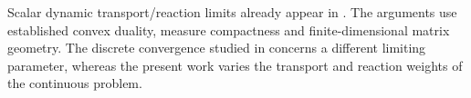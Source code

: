 Scalar dynamic transport/reaction limits already appear in \cite{ChizatEtAl}.
The arguments use established convex duality, measure compactness and
finite-dimensional matrix geometry. The discrete convergence studied in
\cite{LiZouDiscrete} concerns a different limiting parameter, whereas the
present work varies the transport and reaction weights of the continuous
problem.
